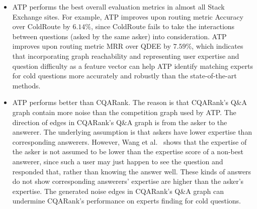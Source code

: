 \documentclass[letterpaper]{article} \usepackage{aaai19}  \usepackage{times}  \usepackage{helvet}  \usepackage{courier}  \usepackage{url}  \usepackage{graphicx}  \usepackage{booktabs} \usepackage{xcolor}
\begin{document}
\begin{itemize}[leftmargin=0.4cm]
    \item ATP performs the best overall evaluation metrics in almost all Stack Exchange sites. For example, ATP improves upon routing metric Accuracy over ColdRoute by $6.14\%$, since ColdRoute fails to take the interactions between questions (asked by the same asker) into consideration.
    ATP improves upon routing metric MRR over QDEE by $7.59\%$, which indicates that incorporating graph reachability and representing user expertise and question difficulty as a feature vector can help ATP identify matching experts for cold questions more accurately and robustly than the state-of-the-art methods. 
    \item ATP performs better than CQARank. The reason is that CQARank's Q$\&$A graph contain more noise than the competition graph used by ATP. The direction of edges in CQARank's Q$\&$A graph is from the asker to the answerer. The underlying assumption is that askers have lower expertise than corresponding answerers. However, Wang et al.~\cite{wang2014} shows that the expertise of the asker is not assumed to be lower than the expertise score of a non-best answerer, since such a user may just happen to see the question and responded that, rather than knowing the answer well. These kinds of answers do not show corresponding answerers' expertise are higher than the asker's expertise. The generated noise edges in CQARank's Q$\&$A graph can undermine CQARank's performance on experts finding for cold questions.
\end{itemize}
\end{document}
